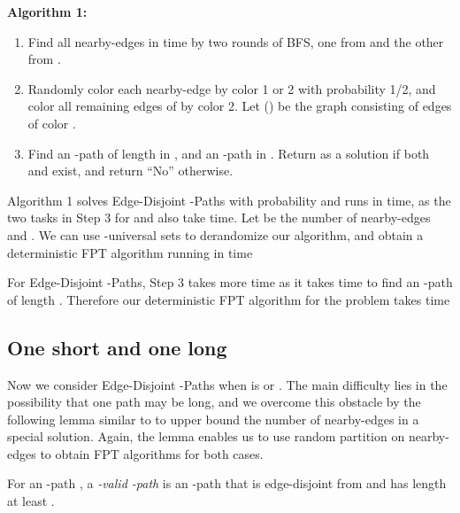 \documentclass{llncs}
\begin{document}
{\bf Algorithm 1: }

\begin{enumerate}
	\item Find all nearby-edges in  time by two rounds of BFS, one from
	 and the other from .
	
	\item Randomly color each nearby-edge by color 1 or 2 with probability 1/2,
	and color all remaining edges of  by color 2.
	Let  () be the graph consisting of edges of color .
	
	\item Find an -path  of length  in , and an
	-path  in .
	Return  as a solution if both  and  exist,
	and return ``No'' otherwise.
\end{enumerate}

Algorithm 1 solves {\sc Edge-Disjoint -Paths}
with probability  and runs in  time,
as the two tasks in Step 3 for  and  also take  time.
Let  be the number of nearby-edges and .
We can use -universal sets to derandomize our algorithm, and obtain
a deterministic FPT algorithm running in time


For {\sc Edge-Disjoint -Paths}, Step 3 takes more
time as it takes  time to find
an -path  of length .
Therefore our deterministic FPT algorithm for the problem takes time



\subsection{One short and one long}

Now we consider {\sc Edge-Disjoint -Paths} when  is
 or .
The main difficulty lies in the possibility that one path may be long, and we
overcome this obstacle by the following lemma similar to 
to upper bound the number of nearby-edges in a special solution.
Again, the lemma enables us to use random partition on nearby-edges to
obtain FPT algorithms for both cases.

For an -path , a {\em -valid -path} is an -path that is edge-disjoint from  and has length at least .
\end{document}
